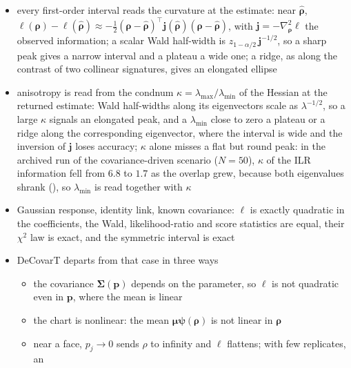 \begin{itemize}
  \item every first-order interval reads the curvature at the estimate: near \(\hat{\boldsymbol{\rho}}\),
        \(\ell(\boldsymbol{\rho})-\ell(\hat{\boldsymbol{\rho}})\approx-\tfrac12(\boldsymbol{\rho}-\hat{\boldsymbol{\rho}})^{\top}\boldsymbol{j}(\hat{\boldsymbol{\rho}})(\boldsymbol{\rho}-\hat{\boldsymbol{\rho}})\), with
        \(\boldsymbol{j}=-\nabla^{2}_{\boldsymbol{\rho}}\ell\) the observed information; a scalar Wald half-width is
        \(z_{1-\alpha/2}\,\boldsymbol{j}^{-1/2}\), so a sharp peak gives a narrow interval and a plateau a wide one;
        a ridge, as along the contrast of two collinear signatures, gives an elongated ellipse
  \item anisotropy is read from the \gls{condnum} \(\kappa=\lambda_{\max}/\lambda_{\min}\) of the Hessian at the returned
        estimate: Wald half-widths along its eigenvectors scale as \(\lambda^{-1/2}\), so a large \(\kappa\) signals an
        elongated peak, and a \(\lambda_{\min}\) close to zero a plateau or a ridge along the corresponding eigenvector,
        where the interval is wide and the inversion of \(\boldsymbol{j}\) loses accuracy; \(\kappa\) alone misses a flat but
        round peak: in the archived run of the covariance-driven scenario (\(N=50\)), \(\kappa\) of the ILR information
        fell from \(6.8\) to \(1.7\) as the overlap grew, because both eigenvalues shrank
        (), so
        \(\lambda_{\min}\) is read together with \(\kappa\)
  \item Gaussian response, identity link, known covariance: \(\ell\) is exactly quadratic in the coefficients,
        the Wald, likelihood-ratio and score statistics are equal, their \(\chi^{2}\) law is exact, and the
        symmetric interval is exact \cite[Sect.~4.3]{agrestiFoundationsLinearGeneralized2015}
  \item DeCovarT departs from that case in three ways
  \begin{itemize}
    \item the covariance \(\boldsymbol{\Sigma}(\boldsymbol{p})\) depends on the parameter, so \(\ell\) is not quadratic even in
          \(\boldsymbol{p}\), where the mean is linear
    \item the chart is nonlinear: the mean \(\boldsymbol{\mu}\boldsymbol{\psi}(\boldsymbol{\rho})\) is not linear in \(\boldsymbol{\rho}\)
    \item near a face, \(p_{j}\to0\) sends \(\rho\) to infinity and \(\ell\) flattens; with few replicates, an

\end{itemize}
\end{itemize}
